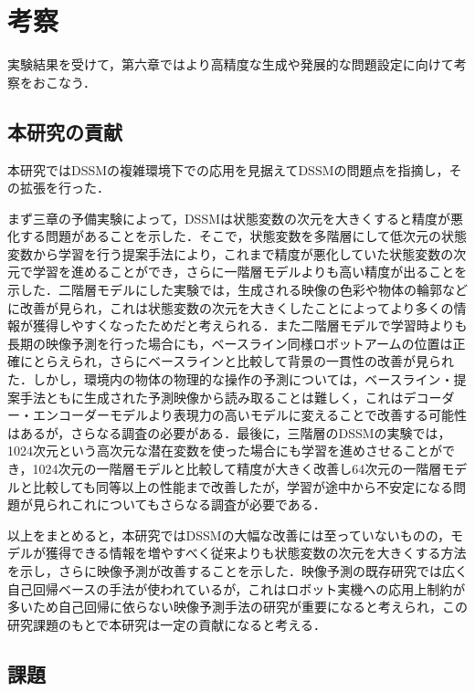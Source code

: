 \chapter{考察}
\label{chap:discussion}

実験結果を受けて，第六章ではより高精度な生成や発展的な問題設定に向けて考察をおこなう．

\section{本研究の貢献}

本研究ではDSSMの複雑環境下での応用を見据えてDSSMの問題点を指摘し，その拡張を行った．

まず三章の予備実験によって，DSSMは状態変数の次元を大きくすると精度が悪化する問題があることを示した．そこで，状態変数を多階層にして低次元の状態変数から学習を行う提案手法により，これまで精度が悪化していた状態変数の次元で学習を進めることができ，さらに一階層モデルよりも高い精度が出ることを示した．二階層モデルにした実験では，生成される映像の色彩や物体の輪郭などに改善が見られ，これは状態変数の次元を大きくしたことによってより多くの情報が獲得しやすくなったためだと考えられる．また二階層モデルで学習時よりも長期の映像予測を行った場合にも，ベースライン同様ロボットアームの位置は正確にとらえられ，さらにベースラインと比較して背景の一貫性の改善が見られた．しかし，環境内の物体の物理的な操作の予測については，ベースライン・提案手法ともに生成された予測映像から読み取ることは難しく，これはデコーダー・エンコーダーモデルより表現力の高いモデルに変えることで改善する可能性はあるが，さらなる調査の必要がある．最後に，三階層のDSSMの実験では，1024次元という高次元な潜在変数を使った場合にも学習を進めさせることができ，1024次元の一階層モデルと比較して精度が大きく改善し64次元の一階層モデルと比較しても同等以上の性能まで改善したが，学習が途中から不安定になる問題が見られこれについてもさらなる調査が必要である．

以上をまとめると，本研究ではDSSMの大幅な改善には至っていないものの，モデルが獲得できる情報を増やすべく従来よりも状態変数の次元を大きくする方法を示し，さらに映像予測が改善することを示した．映像予測の既存研究では広く自己回帰ベースの手法が使われているが，これはロボット実機への応用上制約が多いため自己回帰に依らない映像予測手法の研究が重要になると考えられ，この研究課題のもとで本研究は一定の貢献になると考える．

\section{課題}


